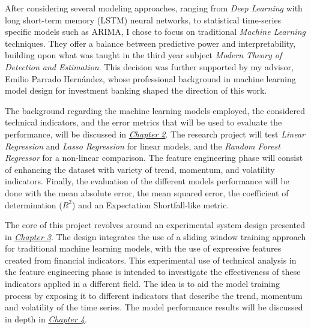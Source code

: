 \documentclass[12pt]{report} %
\begin{document}
After considering several modeling approaches, ranging from \textit{Deep Learning} with long short-term memory (LSTM) neural networks, to statistical time-series specific models such as ARIMA, I chose to focus on traditional \textit{Machine Learning} techniques. They offer a balance between predictive power and interpretability, building upon what was taught in the third year subject \textit{Modern Theory of Detection and Estimation}. This decision was further supported by my advisor, Emilio Parrado Hernández, whose professional background in machine learning model design for investment banking shaped the direction of this work.

The background regarding the machine learning models employed, the considered technical indicators, and the error metrics that will be used to evaluate the performance, will be discussed in \textit{\hyperref[chap:02]{Chapter 2}}. The research project will test \textit{Linear Regression} and \textit{Lasso Regression} for linear models, and the \textit{Random Forest Regressor} for a non-linear comparison. The feature engineering phase will consist of enhancing the dataset with variety of trend, momentum, and volatility indicators. Finally, the evaluation of the different models performance will be done with the mean absolute error, the mean squared error, the coefficient of determination ($R^2$) and an Expectation Shortfall-like metric.

The core of this project revolves around an experimental system design presented in \textit{\hyperref[chap:03]{Chapter 3}}. The design integrates the use of a sliding window training approach for traditional machine learning models, with the use of expressive features created from financial indicators. This experimental use of technical analysis in the feature engineering phase is intended to investigate the effectiveness of these indicators applied in a different field. The idea is to aid the model training process by exposing it to different indicators that describe the trend, momentum and volatility of the time series. The model performance results will be discussed in depth in \textit{\hyperref[chap:04]{Chapter 4}}.

\end{document}
